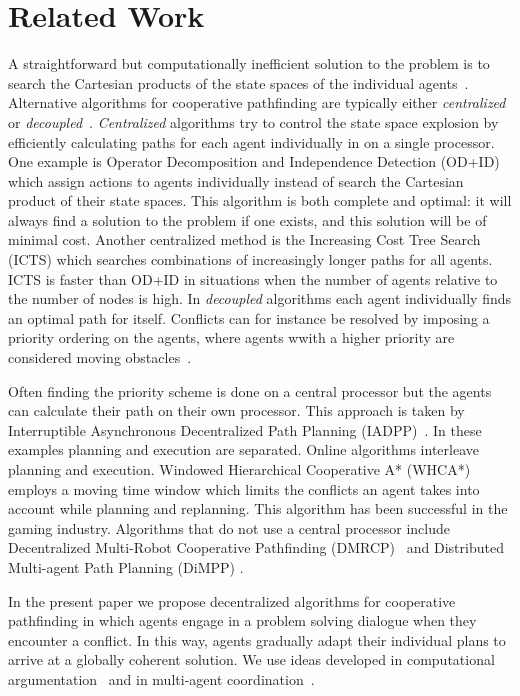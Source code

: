 \section{Related Work}\label{sec:related}
A straightforward but computationally inefficient solution to the problem is to 
search the Cartesian products of the state spaces of the individual 
agents~\cite{hopcroft1984}. Alternative algorithms for cooperative pathfinding 
are typically either \emph{centralized} or \emph{decoupled}~\cite{latombe1991}.
\emph{Centralized} algorithms try to control the state space explosion by 
efficiently calculating paths for each agent individually in on a single 
processor. One example is Operator Decomposition and Independence Detection 
(OD+ID)~\cite{standley2010,standley2011} which assign actions to agents 
individually instead of search the Cartesian product of their state spaces. 
This algorithm is both complete and 
optimal: it will always find a solution to the problem if one exists, and this 
solution will be of minimal cost.
Another centralized method is the Increasing Cost Tree 
Search (ICTS) \cite{sharon2013} which searches combinations of increasingly 
longer paths for all agents. ICTS is faster than OD+ID in situations when the 
number of agents relative to the number of nodes is high.
In \emph{decoupled} algorithms each agent individually finds an optimal path 
for itself. Conflicts can for instance be resolved by imposing a priority 
ordering on the agents, where agents wwith a higher priority are considered 
moving obstacles~\cite{bennewitz2002}.

Often finding the priority scheme is done on a central 
processor but the agents can calculate their path on their own processor. This 
approach is taken by Interruptible Asynchronous Decentralized Path Planning 
(IADPP)~\cite{cap2012}.
In these examples planning and execution are separated. Online algorithms 
interleave planning and execution. Windowed Hierarchical Cooperative A* 
(WHCA*)~\cite{silver2005} employs a moving time window which limits the 
conflicts an agent takes into account while planning and replanning. This 
algorithm has been successful in the gaming industry.
Algorithms that do not use a central processor include Decentralized 
Multi-Robot Cooperative Pathfinding (DMRCP)~\cite{wei2016} and Distributed 
Multi-agent Path Planning (DiMPP) \cite{chouhan2017}.

In the present paper we propose decentralized algorithms for cooperative 
pathfinding in which agents engage in a problem solving dialogue when they 
encounter a conflict. In this way, agents gradually adapt their individual 
plans to arrive at a globally coherent solution. We use ideas developed in 
computational argumentation~\cite{modgil2013} and in multi-agent 
coordination~\cite[pp.~202--204]{woodridge2009}.

